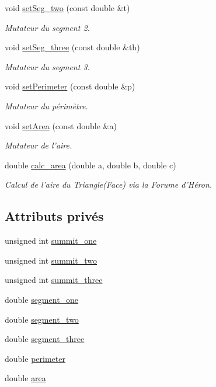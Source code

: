 \begin{DoxyCompactItemize}
void \hyperlink{class_face_a1eebfcfb41d87470d675ab8fb106585e}{set\-Seg\-\_\-two} (const double \&t)
\begin{DoxyCompactList}\small\item\em Mutateur du segment 2. \end{DoxyCompactList}\item 
void \hyperlink{class_face_acc1fc08e71b974483dc876adb43da487}{set\-Seg\-\_\-three} (const double \&th)
\begin{DoxyCompactList}\small\item\em Mutateur du segment 3. \end{DoxyCompactList}\item 
void \hyperlink{class_face_af2be08b9e991f22d85aa39901a353a53}{set\-Perimeter} (const double \&p)
\begin{DoxyCompactList}\small\item\em Mutateur du périmètre. \end{DoxyCompactList}\item 
void \hyperlink{class_face_a6ee83e39c97a515c49f076d55a14b8bd}{set\-Area} (const double \&a)
\begin{DoxyCompactList}\small\item\em Mutateur de l'aire. \end{DoxyCompactList}\item 
double \hyperlink{class_face_a0d460b44871e8f720de067063734aede}{calc\-\_\-area} (double a, double b, double c)
\begin{DoxyCompactList}\small\item\em Calcul de l'aire du Triangle(\-Face) via la Forume d'Héron. \end{DoxyCompactList}\end{DoxyCompactItemize}
\subsection*{Attributs privés}
\begin{DoxyCompactItemize}
\item 
unsigned int \hyperlink{class_face_a68ff25f391cfe3ee5ce2b7f13dac64fa}{summit\-\_\-one}
\item 
unsigned int \hyperlink{class_face_a8d0b2a96bd53dcf7767c2cefe1fcc1f3}{summit\-\_\-two}
\item 
unsigned int \hyperlink{class_face_af322077aea999dd19dd169bd5bdd4bdf}{summit\-\_\-three}
\item 
double \hyperlink{class_face_ae4053947c53549d2fd5cf43aa9c712f4}{segment\-\_\-one}
\item 
double \hyperlink{class_face_ae79107e53090d0a7efb5070ea093a70e}{segment\-\_\-two}
\item 
double \hyperlink{class_face_a777ca579978d8d20c6e8a5e64a6999cc}{segment\-\_\-three}
\item 
double \hyperlink{class_face_a9b759ee3c90c67bc7af3969546f568f9}{perimeter}
\item 
double \hyperlink{class_face_ae63fcd017fcd355e212a2510209db17c}{area}
\end{DoxyCompactItemize}


